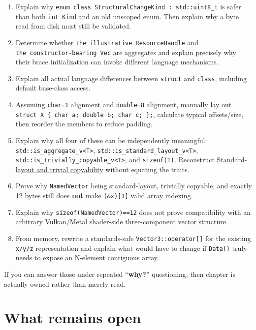 \begin{enumerate}
\item
  Explain why \texttt{enum\ class\ StructuralChangeKind\ :\ std::uint8\_t} is safer than both \texttt{int\ Kind} and an old unscoped enum. Then explain why a byte read from disk must still be validated.
\item
  Determine whether \texttt{the\ illustrative\ ResourceHandle} and \texttt{the\ constructor-bearing\ Vec} are aggregates and explain precisely why their brace initialization can invoke different language mechanisms.
\item
  Explain all actual language differences between \texttt{struct} and \texttt{class}, including default base-class access.
\item
  Assuming \texttt{char=1} alignment and \texttt{double=8} alignment, manually lay out \texttt{struct\ X\ \{\ char\ a;\ double\ b;\ char\ c;\ \};}, calculate typical offsets/size, then reorder the members to reduce padding.
\item
  Explain why all four of these can be independently meaningful: \texttt{std::is\_aggregate\_v\textless{}T\textgreater{}}, \texttt{std::is\_standard\_layout\_v\textless{}T\textgreater{}}, \texttt{std::is\_trivially\_copyable\_v\textless{}T\textgreater{}}, and \texttt{sizeof(T)}. Reconstruct \hyperref[appendix-958870a64c53]{Standard-layout and trivial copyability} without equating the traits.
\item
  Prove why \texttt{NamedVector} being standard-layout, trivially copyable, and exactly 12 bytes still does \textbf{not} make \texttt{(\&x){[}1{]}} valid array indexing.
\item
  Explain why \texttt{sizeof(NamedVector)==12} does not prove compatibility with an arbitrary Vulkan/Metal shader-side three-component vector structure.
\item
  From memory, rewrite a standards-safe \texttt{Vector3::operator{[}{]}} for the existing \texttt{x/y/z} representation and explain what would have to change if \texttt{Data()} truly needs to expose an N-element contiguous array.
\end{enumerate}

If you can answer those under repeated ``\textbf{why?}'' questioning, then chapter is actually owned rather than merely read.

\section{What remains open}\label{01-foundations-i-ch004-what-remains-open}

